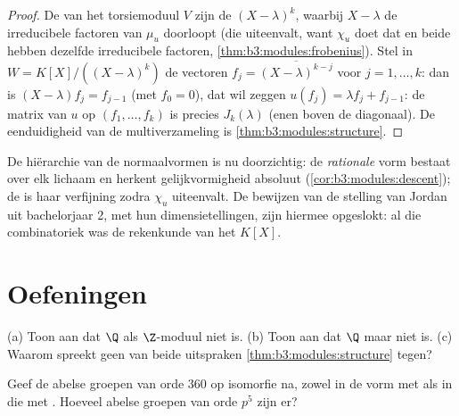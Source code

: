 \begin{proof}
De  van het torsiemoduul $V$ zijn de $(X -
\lambda)^k$, waarbij $X - \lambda$ de irreducibele factoren van
$\mu_u$ doorloopt (die uiteenvalt, want $\chi_u$ doet dat en beide
hebben dezelfde irreducibele factoren,
\cref{thm:b3:modules:frobenius}). Stel in $W = K[X]/((X-\lambda)^k)$
de vectoren $f_j = \overline{(X - \lambda)^{k-j}}$ voor $j = 1,
\dots, k$: dan is $(X - \lambda)f_j = f_{j-1}$ (met $f_0 = 0$), dat
wil zeggen $u(f_j) = \lambda f_j + f_{j-1}$: de matrix van $u$ op
$(f_1, \dots, f_k)$ is precies $J_k(\lambda)$ (enen boven de
diagonaal). De eenduidigheid van de multiverzameling  is \cref{thm:b3:modules:structure}.
\end{proof}

\begin{remark}\label{rem:b3:modules:overview}
De hiërarchie van de normaalvormen is nu doorzichtig: de
\emph{rationale} vorm bestaat over elk lichaam en herkent
gelijkvormigheid absoluut (\cref{cor:b3:modules:descent}); de
\emph{} is haar verfijning zodra $\chi_u$ uiteenvalt. De
bewijzen van de stelling van Jordan uit bachelorjaar 2, met hun
dimensietellingen, zijn hiermee opgeslokt: al die combinatoriek was
de rekenkunde van het  $K[X]$.
\end{remark}

\section{Oefeningen}

\begin{exercise}[$\star$]\label{exo:b3:modules:1}
(a) Toon aan dat $\Q$ als $\Z$-moduul niet  is.
(b) Toon aan dat $\Q$  maar niet  is.
(c) Waarom spreekt geen van beide uitspraken
\cref{thm:b3:modules:structure} tegen?
\end{exercise}

\begin{exercise}[$\star$]\label{exo:b3:modules:2}
Geef de abelse groepen van orde $360$ op isomorfie na, zowel in de
vorm met  als in die met .
Hoeveel abelse groepen van orde $p^5$ zijn er?
\end{exercise}

